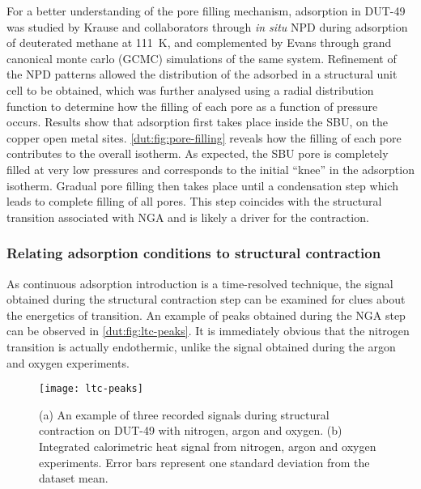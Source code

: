 For a better understanding of the pore filling mechanism, adsorption
in DUT-49 was studied by Krause and collaborators 
through \textit{in situ} \gls{NPD} during adsorption of
deuterated methane  at \SI{111}{\kelvin},
and complemented by Evans through grand canonical monte carlo
(GCMC) simulations of the same system. 
Refinement of the \gls{NPD} patterns allowed the distribution
of the adsorbed  in a structural unit cell to be obtained, which
was further analysed using a radial distribution function to determine
how the filling of each pore as a function of pressure occurs. 
Results show that adsorption first takes place inside the \gls{SBU},
on the copper open metal sites.
\autoref{dut:fig:pore-filling} reveals how
the filling of each pore contributes to the overall isotherm.
As expected, the \gls{SBU} pore is completely filled at very low pressures
and corresponds to the initial ``knee'' in the adsorption isotherm. Gradual
pore filling then takes place until a condensation step which 
leads to complete filling of all pores. This step coincides with 
the structural transition associated with \gls{NGA} and is likely a driver 
for the contraction.

\subsubsection{Relating adsorption conditions to structural contraction}

As continuous adsorption introduction is a time-resolved technique, 
the signal obtained during the structural contraction step can 
be examined for clues about the energetics of transition. An example 
of peaks obtained during the \gls{NGA} step can be observed in 
\autoref{dut:fig:ltc-peaks}. It is immediately obvious that 
the nitrogen transition is actually endothermic, unlike the 
signal obtained during the argon and oxygen experiments.

\begin{figure}[htb]
    \centering
    \texttt{[image: ltc-peaks]}%
    \caption{(a) An example of three recorded signals during 
    structural contraction on DUT-49 with nitrogen, argon and 
    oxygen. (b) Integrated calorimetric heat signal from 
    nitrogen, argon and oxygen experiments. Error bars 
    represent one standard deviation from the dataset mean.}%
    \label{dut:fig:ltc-peaks}
\end{figure}

